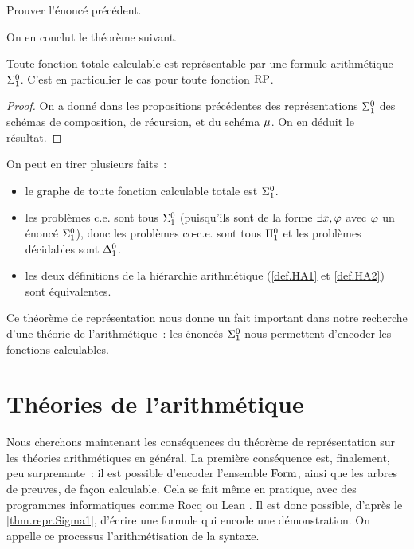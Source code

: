 \begin{exercise}
  Prouver l'énoncé précédent.
\end{exercise}

\noindent
On en conclut le théorème suivant.

\begin{theorem}
  \label{thm.repr.Sigma1}
  Toute fonction totale calculable est représentable par une formule
  arithmétique $\Sigma^0_{1}$. C'est en particulier le cas pour toute fonction
  $\operatorname{RP}$.
\end{theorem}

\begin{proof}
  On a donné dans les propositions précédentes des représentations
  $\Sigma^0_{1}$ des schémas de composition, de récursion, et du schéma $\mathbin{\mu}$.
  On en déduit le résultat.
\end{proof}

On peut en tirer plusieurs faits~:
\begin{itemize}
\item le graphe de toute fonction calculable totale est $\Sigma^0_{1}$.
\item les problèmes c.e. sont tous $\Sigma^0_{1}$ (puisqu'ils sont de la
  forme $\exists x, \varphi$ avec $\varphi$ un énoncé $\Sigma^0_{1}$), donc
  les problèmes co-c.e. sont tous $\Pi^0_{1}$ et les problèmes
  décidables sont $\Delta^0_{1}$.
\item les deux définitions de la hiérarchie arithmétique (\cref{def.HA1} et
  \cref{def.HA2}) sont équivalentes.
\end{itemize}

Ce théorème de représentation nous donne un fait important dans notre recherche
d'une théorie de l'arithmétique~: les énoncés $\Sigma^0_{1}$ nous permettent
d'encoder les fonctions calculables.

\section{Théories de l'arithmétique}

Nous cherchons maintenant les conséquences du théorème de représentation sur les
théories arithmétiques en général. La première conséquence est, finalement, peu
surprenante~: il est possible d'encoder l'ensemble $\operatorname{Form}$, ainsi que les
arbres de preuves, de façon calculable. Cela se fait même en pratique, avec des
programmes informatiques comme Rocq \cite{RocqReferenceManual} ou Lean
\cite{MouraUllrich2021}.
Il est donc possible, d'après le \cref{thm.repr.Sigma1}, d'écrire une formule
qui encode une démonstration. On appelle ce processus l'arithmétisation de la
syntaxe.

